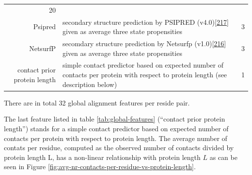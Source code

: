 \documentclass[11pt,a4paper,twoside]{book}
\theoremstyle{definition}
\theoremstyle{definition}
\theoremstyle{remark}
\begin{document}
\begin{longtable}[]{@{}rlc@{}}
\begin{minipage}[t]{0.18\columnwidth}
20\strut
\end{minipage}\tabularnewline
\begin{minipage}[t]{0.23\columnwidth}\raggedleft\strut
Psipred\strut
\end{minipage} & \begin{minipage}[t]{0.50\columnwidth}\raggedright\strut
secondary structure prediction by PSIPRED
(v4.0){[}\protect\hyperlink{ref-Jones1999}{217}{]} given as average
three state propensities\strut
\end{minipage} & \begin{minipage}[t]{0.18\columnwidth}\centering\strut
3\strut
\end{minipage}\tabularnewline
\begin{minipage}[t]{0.23\columnwidth}\raggedleft\strut
NetsurfP\strut
\end{minipage} & \begin{minipage}[t]{0.50\columnwidth}\raggedright\strut
secomdary structure prediction by Netsurfp
(v1.0){[}\protect\hyperlink{ref-Petersen2009a}{216}{]} given as average
three state propensities\strut
\end{minipage} & \begin{minipage}[t]{0.18\columnwidth}\centering\strut
3\strut
\end{minipage}\tabularnewline
\begin{minipage}[t]{0.23\columnwidth}\raggedleft\strut
contact prior protein length\strut
\end{minipage} & \begin{minipage}[t]{0.50\columnwidth}\raggedright\strut
simple contact predictor based on expected number of contacts per
protein with respect to protein length (see description below)\strut
\end{minipage} & \begin{minipage}[t]{0.18\columnwidth}\centering\strut
1\strut
\end{minipage}\tabularnewline
\bottomrule
\end{longtable}

There are in total 32 global alignment features per reside pair.

The last feature listed in table \ref{tab:global-features} (``contact
prior protein length'') stands for a simple contact predictor based on
expected number of contacts per protein with respect to protein length.
The average number of contats per residue, computed as the observed
number of contacts divided by protein length L, has a non-linear
relationship with protein length \(L\) as can be seen in Figure
\ref{fig:avg-nr-contacts-per-residue-vs-protein-length}.
\end{document}
